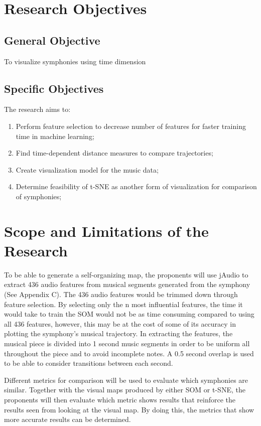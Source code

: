 \section{Research Objectives}
\label{sec:researchobjectives}
\subsection{General Objective}
\label{sec:generalobjective}
To visualize symphonies using time dimension
\subsection{Specific Objectives}
\label{sec:specificobjectives}
The research aims to:
\begin{enumerate}
\item Perform feature selection to decrease number of features for faster training time in machine learning;
\item Find time-dependent distance measures to compare trajectories;
\item Create visualization model for the music data;
\item Determine feasibility of t-SNE as another form of visualization for comparison of symphonies;
\end{enumerate}
\section{Scope and Limitations of the Research}
\label{sec:scopelimitations}
To be able to generate a self-organizing map, the proponents will use jAudio to extract 436 audio features from musical segments generated from the symphony (See Appendix C). The 436 audio features would be trimmed down through feature selection. By selecting only the n most influential features, the time it would take to train the SOM would not be as time consuming compared to using all 436 features, however, this may be at the cost of some of its accuracy in plotting the symphony’s musical trajectory. In extracting the features, the musical piece is divided into 1 second music segments in order to be uniform all throughout the piece and to avoid incomplete notes. A 0.5 second overlap is used to be able to consider transitions between each second. 

Different metrics for comparison will be used to evaluate which symphonies are similar. Together with the visual maps produced by either SOM or t-SNE, the proponents will then evaluate which metric shows results that reinforce the results seen from looking at the visual map. By doing this, the metrics that show more accurate results can be determined.

